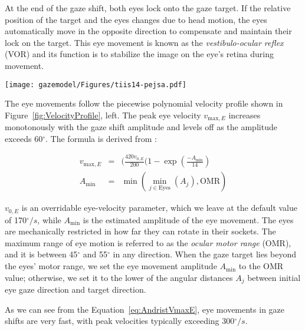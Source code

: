At the end of the gaze shift, both eyes lock onto the gaze target. If the relative position of the target and the eyes changes due to head motion, the eyes automatically move in the opposite direction to compensate and maintain their lock on the target. This eye movement is known as the \emph{vestibulo-ocular reflex} (VOR) and its function is to stabilize the image on the eye's retina during movement.

\begin{figure*}[t]
\centering
\texttt{[image: gazemodel/Figures/tiis14-pejsa.pdf]}
\caption{Velocity profiles for the motion of different body parts. Left: Eye velocity. Right: Head and torso velocities. Mathematical expressions for the profiles are given in equations~\ref{eq:EyeVelocity} and~\ref{eq:HeadTorsoVelocity}.}
\label{fig:VelocityProfile}
\end{figure*}

The eye movements follow the piecewise polynomial velocity profile shown in Figure~\ref{fig:VelocityProfile}, left. The peak eye velocity $v_{\mathrm{max},E}$ increases monotonously with the gaze shift amplitude and levels off as the amplitude exceeds 60$^{\circ}$. The formula is derived from \citet{baloh1975quantitative}:

\begin{align} \label{eq:AndristVmaxE}
v_{\mathrm{max},E} &=& (\frac{420 v_{0,E}}{200} (1 - \mathop{exp}(\frac{-A_{\mathrm{min}}}{14}) \\
A_{\mathrm{min}} &=& \mathop{min}( \mathop{min}_{j \in \mathrm{Eyes}}(A_j), \mathrm{OMR} ) \nonumber
\end{align}

$v_{0,E}$ is an overridable eye-velocity parameter, which we leave at the default value of 170$^{\circ}/s$, while $A_{\mathrm{min}}$ is the estimated amplitude of the eye movement. The eyes are mechanically restricted in how far they can rotate in their sockets. The maximum range of eye motion is referred to as the \emph{ocular motor range} (OMR), and it is between 45$^{\circ}$ and 55$^{\circ}$ in any direction. When the gaze target lies beyond the eyes' motor range, we set the eye movement amplitude $A_{\mathrm{min}}$ to the OMR value; otherwise, we set it to the lower of the angular distances $A_j$ between initial eye gaze direction and target direction.

As we can see from the Equation~\ref{eq:AndristVmaxE}, eye movements in gaze shifts are very fast, with peak velocities typically exceeding 300$^{\circ}/s$.

